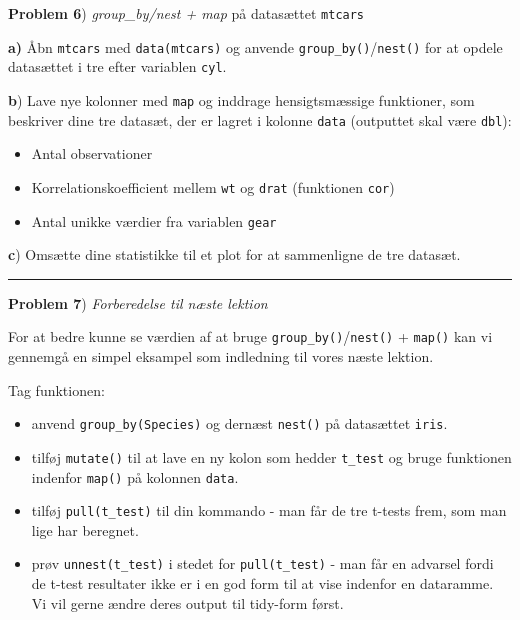 \documentclass[
]{book}
\newenvironment{Shaded}{\begin{snugshade}}{\end{snugshade}}
\newcommand{\ErrorTok}[1]{\textcolor[rgb]{0.64,0.00,0.00}{\textbf{#1}}}
\newcommand{\FunctionTok}[1]{\textcolor[rgb]{0.00,0.00,0.00}{#1}}
\newcommand{\NormalTok}[1]{#1}
\newcommand{\OtherTok}[1]{\textcolor[rgb]{0.56,0.35,0.01}{#1}}
\newcommand{\SpecialCharTok}[1]{\textcolor[rgb]{0.00,0.00,0.00}{#1}}
\providecommand{\tightlist}{%
  \setlength{\itemsep}{0pt}\setlength{\parskip}{0pt}}
\begin{document}
\textbf{Problem 6}) \emph{group\_by/nest + map} på datasættet \texttt{mtcars}

\textbf{a)} Åbn \texttt{mtcars} med \texttt{data(mtcars)} og anvende \texttt{group\_by()}/\texttt{nest()} for at opdele datasættet i tre efter variablen \texttt{cyl}.

\textbf{b}) Lave nye kolonner med \texttt{map} og inddrage hensigtsmæssige funktioner, som beskriver dine tre datasæt, der er lagret i kolonne \texttt{data} (outputtet skal være \texttt{dbl}):

\begin{itemize}
\tightlist
\item
  Antal observationer
\item
  Korrelationskoefficient mellem \texttt{wt} og \texttt{drat} (funktionen \texttt{cor})
\item
  Antal unikke værdier fra variablen \texttt{gear}
\end{itemize}

\textbf{c}) Omsætte dine statistikke til et plot for at sammenligne de tre datasæt.

\begin{center}\rule{0.5\linewidth}{0.5pt}\end{center}

\textbf{Problem 7}) \emph{Forberedelse til næste lektion}

For at bedre kunne se værdien af at bruge \texttt{group\_by()}/\texttt{nest()} + \texttt{map()} kan vi gennemgå en simpel eksampel som indledning til vores næste lektion.

Tag funktionen:

\begin{Shaded}
\end{Shaded}

\begin{itemize}
\tightlist
\item
  anvend \texttt{group\_by(Species)} og dernæst \texttt{nest()} på datasættet \texttt{iris}.
\item
  tilføj \texttt{mutate()} til at lave en ny kolon som hedder \texttt{t\_test} og bruge funktionen indenfor \texttt{map()} på kolonnen \texttt{data}.
\item
  tilføj \texttt{pull(t\_test)} til din kommando - man får de tre t-tests frem, som man lige har beregnet.
\item
  prøv \texttt{unnest(t\_test)} i stedet for \texttt{pull(t\_test)} - man får en advarsel fordi de t-test resultater ikke er i en god form til at vise indenfor en dataramme. Vi vil gerne ændre deres output til tidy-form først.
\end{itemize}
\end{document}
